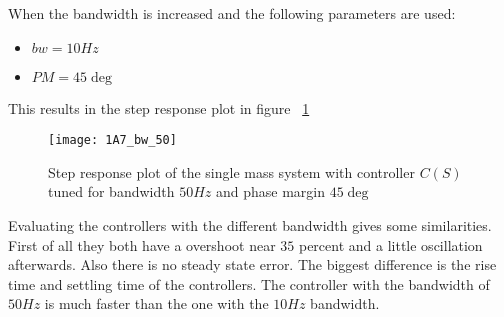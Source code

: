 \documentclass[report.tex]{subfiles}
\begin{document}
When the bandwidth is increased and the following parameters are used: 
\begin{itemize}
\item{$bw = 10 Hz$}
\item{$PM = 45\deg$}
\end{itemize}
This results in the step response plot in figure ~\ref{fig:1A7_bw_50}
\begin{figure}
  \centering
\texttt{[image: 1A7\_bw\_50]}
\caption{Step response plot of the single mass system with controller $C(S)$ tuned for bandwidth $50 Hz$ and phase margin $45\deg$}
\label{fig:1A7_bw_50}
\end{figure}

Evaluating the controllers with the different bandwidth gives some similarities. 
First of all they both have a overshoot near $35$ percent and a little oscillation afterwards. Also there is no steady state error. 
The biggest difference is the rise time and settling time of the controllers. The controller with the bandwidth of $50Hz$ is much faster than the one with the $10Hz$ bandwidth.  



\end{document}
